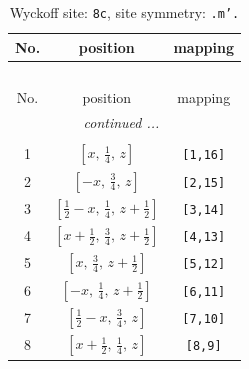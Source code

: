 \documentclass[fleqn,8pt]{jsarticle}
\begin{document}
\begin{longtable}{ccc}
\caption{Wyckoff site: {\tt 8c}, site symmetry: {\tt .m'.}}
 \\
 \hline \hline
No. & position & mapping \\ \hline \endfirsthead

\multicolumn{2}{l}{\tablename\ \thetable{}} \\
 \hline \hline
No. & position & mapping \\ \hline \endhead

 \hline \hline
\multicolumn{2}{r}{\footnotesize\it continued ...} \\ \endfoot

 \hline \hline
\multicolumn{2}{r}{} \\ \endlastfoot

1 & $\left[ x,\, \frac{1}{4},\, z \right]$ & {\tt [1,16]} \\ \hline
2 & $\left[ - x,\, \frac{3}{4},\, z \right]$ & {\tt [2,15]} \\ \hline
3 & $\left[ \frac{1}{2} - x,\, \frac{1}{4},\, z + \frac{1}{2} \right]$ & {\tt [3,14]} \\ \hline
4 & $\left[ x + \frac{1}{2},\, \frac{3}{4},\, z + \frac{1}{2} \right]$ & {\tt [4,13]} \\ \hline
5 & $\left[ x,\, \frac{3}{4},\, z + \frac{1}{2} \right]$ & {\tt [5,12]} \\ \hline
6 & $\left[ - x,\, \frac{1}{4},\, z + \frac{1}{2} \right]$ & {\tt [6,11]} \\ \hline
7 & $\left[ \frac{1}{2} - x,\, \frac{3}{4},\, z \right]$ & {\tt [7,10]} \\ \hline
8 & $\left[ x + \frac{1}{2},\, \frac{1}{4},\, z \right]$ & {\tt [8,9]} \\
\end{longtable}
\renewcommand{\arraystretch}{1.2}
\end{document}
